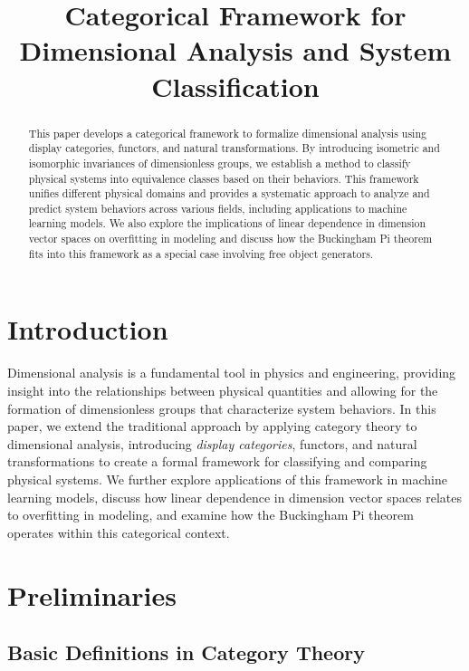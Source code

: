 \documentclass{article}
\title{Categorical Framework for Dimensional Analysis and System Classification}
\author{}
\date{}
\theoremstyle{definition}
\theoremstyle{remark}
\begin{document}
	
	\maketitle
	
	\begin{abstract}
		This paper develops a categorical framework to formalize dimensional analysis using display categories, functors, and natural transformations. By introducing isometric and isomorphic invariances of dimensionless groups, we establish a method to classify physical systems into equivalence classes based on their behaviors. This framework unifies different physical domains and provides a systematic approach to analyze and predict system behaviors across various fields, including applications to machine learning models. We also explore the implications of linear dependence in dimension vector spaces on overfitting in modeling and discuss how the Buckingham Pi theorem fits into this framework as a special case involving free object generators.
	\end{abstract}
	
	\tableofcontents
	
	\section{Introduction}
	
	Dimensional analysis is a fundamental tool in physics and engineering, providing insight into the relationships between physical quantities and allowing for the formation of dimensionless groups that characterize system behaviors. In this paper, we extend the traditional approach by applying category theory to dimensional analysis, introducing \emph{display categories}, functors, and natural transformations to create a formal framework for classifying and comparing physical systems. We further explore applications of this framework in machine learning models, discuss how linear dependence in dimension vector spaces relates to overfitting in modeling, and examine how the Buckingham Pi theorem operates within this categorical context.
	
	\section{Preliminaries}
	
	\subsection{Basic Definitions in Category Theory}
	
\end{document}
